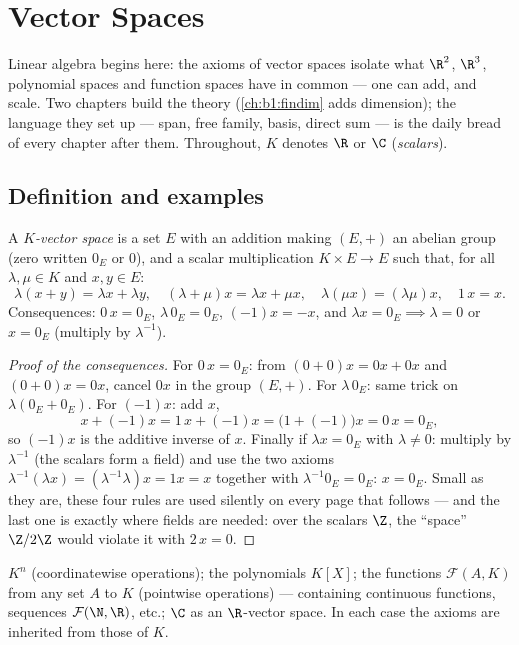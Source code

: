 \chapter{Vector Spaces}\label{ch:b1:vspaces}

Linear algebra begins here: the axioms of vector spaces isolate what
$\R^2$, $\R^3$, polynomial spaces and function spaces have in common
--- one can add, and scale. Two chapters build the theory
(\cref{ch:b1:findim} adds dimension); the language they set up ---
span, free family, basis, direct sum --- is the daily bread of every
chapter after them. Throughout, $K$ denotes $\R$ or $\C$
(\emph{scalars}).

\section{Definition and examples}

\begin{definition}\label{def:b1:vspaces:def}
A \emph{$K$-vector space} is a set $E$ with an
addition making $(E, +)$ an abelian group (zero written $0_E$ or
$0$), and a scalar multiplication $K \times E \to E$ such that, for
all $\lambda, \mu \in K$ and $x, y \in E$:
\[
\lambda(x + y) = \lambda x + \lambda y,\quad
(\lambda + \mu) x = \lambda x + \mu x,\quad
\lambda(\mu x) = (\lambda\mu) x,\quad
1\,x = x .
\]
Consequences: $0\,x = 0_E$, $\lambda\,0_E = 0_E$, $(-1)x = -x$, and
$\lambda x = 0_E \implies \lambda = 0$ or $x = 0_E$ (multiply by
$\lambda^{-1}$).
\end{definition}

\begin{proof}[Proof of the consequences]
For $0\,x = 0_E$: from $(0 + 0)x = 0x + 0x$ and $(0+0)x = 0x$,
cancel $0x$ in the group $(E, +)$. For $\lambda\,0_E$: same
trick on $\lambda(0_E + 0_E)$. For $(-1)x$: add $x$,
\[
x + (-1)x = 1\,x + (-1)x = \bigl(1 + (-1)\bigr)x = 0\,x = 0_E ,
\]
so $(-1)x$ is the additive inverse of $x$. Finally if $\lambda x
= 0_E$ with $\lambda \neq 0$: multiply by $\lambda^{-1}$ (the
scalars form a field) and use the two axioms
$\lambda^{-1}(\lambda x) = (\lambda^{-1}\lambda)x = 1x = x$
together with $\lambda^{-1}0_E = 0_E$: $x = 0_E$. Small as they
are, these four rules are used silently on every page that
follows --- and the last one is exactly where fields are needed:
over the scalars $\Z$, the ``space'' $\Z/2\Z$ would violate it
with $2\,x = 0$.
\end{proof}

\begin{example}\label{ex:b1:vspaces:examples}
$K^n$ (coordinatewise operations); the polynomials $K[X]$; the
functions $\mathcal{F}(A, K)$ from any set $A$ to $K$ (pointwise
operations) --- containing continuous functions, sequences
$\mathcal{F}(\N, \R)$, etc.; $\C$ as an $\R$-vector space. In each
case the axioms are inherited from those of $K$.
\end{example}

